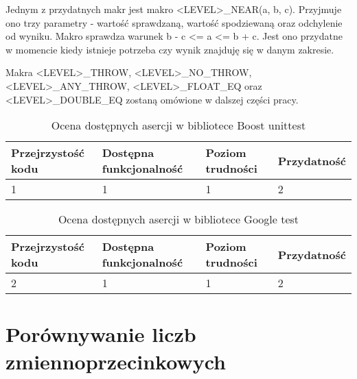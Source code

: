 \documentclass[12pt,a4paper,notitlepage]{report}
\begin{document}
Jednym z przydatnych makr jest makro <LEVEL>{\_}NEAR(a, b, c). Przyjmuje ono trzy parametry - wartość sprawdzaną, wartość spodziewaną oraz odchylenie od wyniku. Makro sprawdza warunek b - c <= a <= b + c. Jest ono przydatne w momencie kiedy istnieje potrzeba czy wynik znajduję się w danym zakresie.

Makra <LEVEL>{\_}THROW, <LEVEL>{\_}NO{\_}THROW, <LEVEL>{\_}ANY{\_}THROW, <LEVEL>{\_}FLOAT{\_}EQ oraz <LEVEL>{\_}DOUBLE{\_}EQ zostaną omówione w dalszej części pracy.

			

\begin{center}
			\begin{table}[!ht]
			\caption{Ocena dostępnych asercji w bibliotece Boost unittest}
			\label{}
			\begin{tabular}[!hc]{|l|l|l|l|}
		\hline
		Przejrzystość kodu 	&	Dostępna funkcjonalność	&	Poziom trudności	&	Przydatność \\ \hline
		1					&	1						&	1					& 	2  			\\ \hline
			\end{tabular}
			\end{table} 
		\end{center}

\begin{center}
			\begin{table}[!ht]
			\caption{Ocena dostępnych asercji w bibliotece Google test}
			\label{}
			\begin{tabular}[!hc]{|l|l|l|l|}
		\hline
		Przejrzystość kodu 	&	Dostępna funkcjonalność	&	Poziom trudności	&	Przydatność \\ \hline
		2					&	1						&	1					& 	2  			\\ \hline
			\end{tabular}
			\end{table} 
		\end{center}

\section{Porównywanie liczb zmiennoprzecinkowych}
\end{document}
